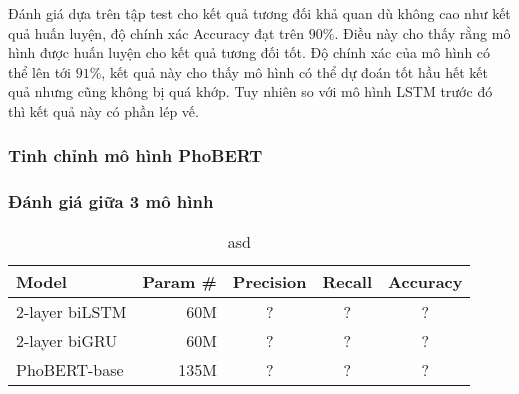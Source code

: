 Đánh giá dựa trên tập test cho kết quả tương đối khả quan dù không cao như kết quả huấn luyện, độ chính xác Accuracy đạt trên $90\%$. Điều này cho thấy rằng mô hình được huấn luyện cho kết quả tương đối tốt. Độ chính xác của mô hình có thể lên tới $91\%$, kết quả này cho thấy mô hình có thể dự đoán tốt hầu hết kết quả nhưng cũng không bị quá khớp. Tuy nhiên so với mô hình LSTM trước đó thì kết quả này có phần lép vế.

\subsubsection{Tinh chỉnh mô hình PhoBERT}

\subsubsection{Đánh giá giữa 3 mô hình}

\begin{table}[htb]
    \centering
    \caption{asd}
    \begin{tabular}{l r c c c}
        \toprule
        \textbf{Model} & \textbf{Param \#} & \textbf{Precision} & \textbf{Recall} & \textbf{Accuracy} \\\midrule
        2-layer biLSTM & 60M               & ?                  & ?               & ?                 \\
        2-layer biGRU  & 60M               & ?                  & ?               & ?                 \\
        PhoBERT-base   & 135M              & ?                  & ?               & ?                 \\
        \bottomrule
    \end{tabular}
\end{table}